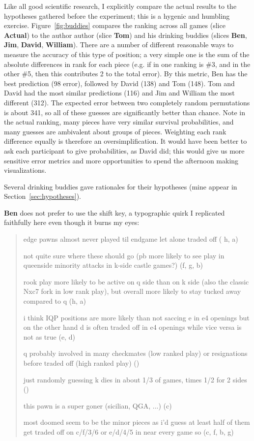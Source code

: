 \documentclass[twocolumn]{article}
\begin{document}
Like all good scientific research, I explicitly compare the actual
results to the hypotheses gathered before the experiment; this is a
hygenic and humbling exercise. Figure~\ref{fig:buddies} compares the
ranking across all games (slice {\bf Actual}) to the author author
(slice {\bf Tom}) and his drinking buddies (slices {\bf Ben}, {\bf
  Jim}, {\bf David}, {\bf William}). There are a number of different
reasonable ways to measure the accuracy of this type of position; a
very simple one is the sum of the absolute differences in rank for
each piece (e.g. if in one ranking \king is \#3, and in the other \#5,
then this contributes 2 to the total error). By this metric, Ben has
the best prediction (98 error), followed by David (138) and Tom (148).
Tom and David had the most similar predictions (116) and Jim and
William the most different (312). The expected error between two
completely random permutations is about 341, so all of these guesses
are significantly better than chance. Note in the actual ranking, many
pieces have very similar survival probabilities, and many guesses are
ambivalent about groups of pieces. Weighting each rank difference
equally is therefore an oversimplification. It would have been better
to ask each participant to give probabilities, as David did; this
would give us more sensitive error metrics and more opportunities to
spend the afternoon making visualizations.

Several drinking buddies gave rationales for their hypotheses (mine
appear in Section~\ref{sec:hypotheses}).

\medskip
{\bf Ben} does not prefer to use the shift key, a typographic quirk I
replicated faithfully here even though it burns my eyes:

\begin{quote}
edge pawns almost never played til endgame let alone traded off (\pawn
h, \pawn a)

not quite sure where these should go (pb more likely to see play in
queenside minority attacks in k-side castle games?) (\pawn f, \pawn g, \pawn b)

rook play more likely to be active on q side than on k side (also the
classic Nxc7 fork in low rank play), but overall more likely to stay
tucked away compared to q (\rook h, \rook a)

i think IQP positions are more likely than not saccing e in e4 openings
but on the other hand d is often traded off in e4 openings while vice
versa is not as true (\pawn e, \pawn d)

q probably involved in many checkmates (low ranked play) or resignations
before traded off (high ranked play) (\queen)

just randomly guessing k dies in about 1/3 of games, times 1/2 for 2
sides (\king)

this pawn is a super goner (sicilian, QGA, ...) (\pawn c)

most doomed seem to be the minor pieces as i'd guess at least half of
them get traded off on c/f/3/6 or e/d/4/5 in near every game so (\bishop c, \bishop f, \knight b, \knight g)
\end{quote}
\end{document}
